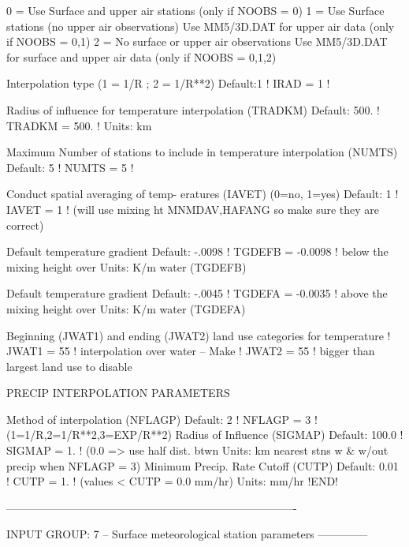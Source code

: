 \documentclass[a4paper,10pt]{article}
\begin{document}
          0 = Use Surface and upper air stations
              (only if NOOBS = 0)
          1 = Use Surface stations (no upper air observations)
              Use MM5/3D.DAT for upper air data
              (only if NOOBS = 0,1)
          2 = No surface or upper air observations
              Use MM5/3D.DAT for surface and upper air data
              (only if NOOBS = 0,1,2)

       Interpolation type
       (1 = 1/R ; 2 = 1/R**2)                Default:1         ! IRAD =  1  !

       Radius of influence for temperature
       interpolation (TRADKM)                Default: 500.     ! TRADKM = 500. !
                                             Units: km

       Maximum Number of stations to include
       in temperature interpolation (NUMTS)  Default: 5        ! NUMTS = 5  !

       Conduct spatial averaging of temp-
       eratures (IAVET)  (0=no, 1=yes)       Default: 1        ! IAVET =  1  !
       (will use mixing ht MNMDAV,HAFANG
        so make sure they are correct)

       Default temperature gradient          Default: -.0098   ! TGDEFB = -0.0098 !
       below the mixing height over          Units: K/m
       water (TGDEFB)

       Default temperature gradient          Default: -.0045   ! TGDEFA = -0.0035 !
       above the mixing height over          Units: K/m
       water (TGDEFA)

       Beginning (JWAT1) and ending (JWAT2)
       land use categories for temperature                    ! JWAT1 =  55  !
       interpolation over water -- Make                       ! JWAT2 =  55  !
       bigger than largest land use to disable

   PRECIP INTERPOLATION PARAMETERS

       Method of interpolation (NFLAGP)      Default: 2       ! NFLAGP =  3  !
        (1=1/R,2=1/R**2,3=EXP/R**2)
       Radius of Influence  (SIGMAP)         Default: 100.0   ! SIGMAP = 1. !
        (0.0 => use half dist. btwn          Units: km
         nearest stns w & w/out
         precip when NFLAGP = 3)
       Minimum Precip. Rate Cutoff (CUTP)    Default: 0.01    ! CUTP = 1. !
        (values < CUTP = 0.0 mm/hr)          Units: mm/hr
!END!


-------------------------------------------------------------------------------

INPUT GROUP: 7 -- Surface meteorological station parameters
--------------
\end{document}
